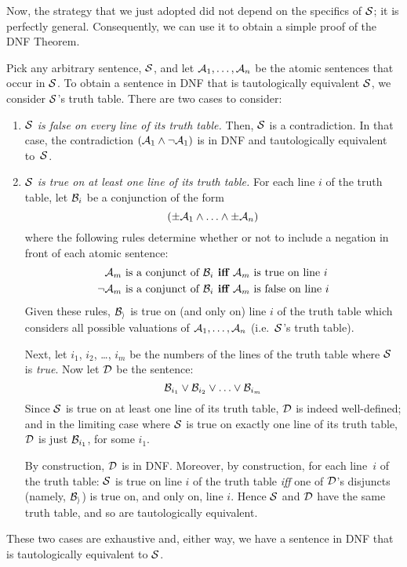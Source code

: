 Now, the strategy that we just adopted did not depend on the specifics of $\mathcal{S}$; it is perfectly general. Consequently, we can use it to obtain a simple proof of the DNF Theorem.

Pick any arbitrary sentence, $\mathcal{S}$, and let $\mathcal{A}_1, \ldots, \mathcal{A}_n$ be the atomic sentences that occur in $\mathcal{S}$. To obtain a sentence in DNF that is tautologically equivalent $\mathcal{S}$, we consider $\mathcal{S}$'s truth table. There are two cases to consider:
	\begin{enumerate}
		\item \emph{$\mathcal{S}$ is false on every line of its truth table.} Then, $\mathcal{S}$ is a contradiction. In that case, the contradiction $(\mathcal{A}_1 \wedge \neg \mathcal{A}_1)$ is in DNF and tautologically equivalent to~$\mathcal{S}$. 
	
		\item \emph{$\mathcal{S}$ is true on at least one line of its truth table.}
		For each line $i$ of the truth table, let $\mathcal{B}_i$ be a conjunction of the form 
		$$(\pm\mathcal{A}_1 \land \ldots \land \pm\mathcal{A}_n)$$
		where the following rules determine whether or not to include a negation in front of each atomic sentence:
			\begin{align*}
				\mathcal{A}_m\text{ is a conjunct of }\mathcal{B}_i&\textbf{ iff }\mathcal{A}_m\text{ is true on line }i\\
				\neg\mathcal{A}_m\text{ is a conjunct of }\mathcal{B}_i&\textbf{ iff }\mathcal{A}_m\text{ is false on line }i
			\end{align*}
		Given these rules, $\mathcal{B_i}$ is true on (and only on) line $i$ of the truth table which considers all possible valuations of $\mathcal{A}_1, \ldots, \mathcal{A}_n$ (i.e.\ $\mathcal{S}$'s truth table). 
		
		Next, let $i_1$, $i_2$, \dots, $i_m$ be the numbers of the lines of the truth table where $\mathcal{S}$ is \emph{true}. Now let $\mathcal{D}$ be the sentence:
		$$\mathcal{B}_{i_1} \vee \mathcal{B}_{i_2} \vee \ldots \vee \mathcal{B}_{i_m}$$
		Since $\mathcal{S}$ is true on at least one line of its truth table, $\mathcal{D}$ is indeed well-defined; and in the limiting case where $\mathcal{S}$ is true on exactly one line of its truth table, $\mathcal{D}$ is just $\mathcal{B}_{i_1}$, for some $i_1$.
		
		By construction, $\mathcal{D}$ is in DNF. Moreover, by construction, for each line~$i$ of the truth table: $\mathcal{S}$ is true on line $i$ of the truth table \emph{iff} one of $\mathcal{D}$'s disjuncts (namely, $\mathcal{B_i}$) is true on, and only on, line $i$. Hence $\mathcal{S}$ and $\mathcal{D}$ have the same truth table, and so are tautologically equivalent.
	\end{enumerate}
	These two cases are exhaustive and, either way, we have a sentence in DNF that is tautologically equivalent to $\mathcal{S}$.

